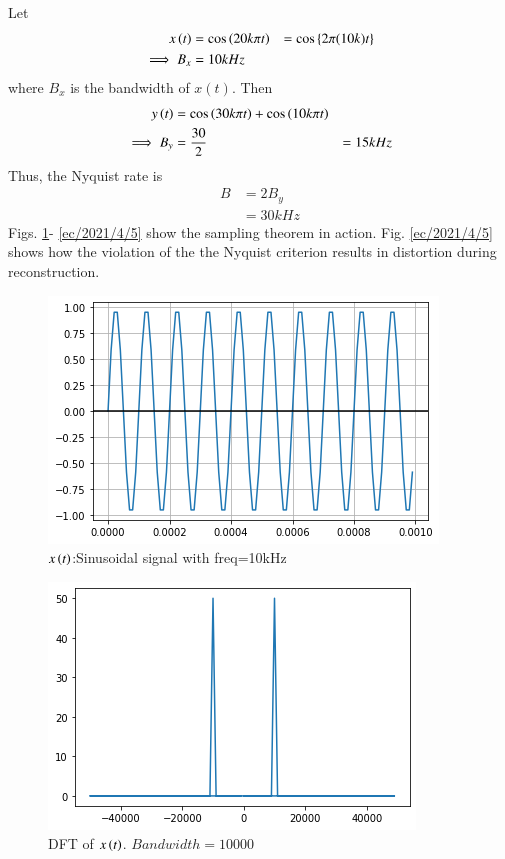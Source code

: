 Let 
\begin{align}
  x\left(t\right)&=\cos{\ensuremath{\left(20k\pi t\right)}}
  &= \cos{\ensuremath{\left\{2\pi (10k) t\right\}}}
  \\
  \implies B_x &= 10 kHz
\end{align}
where $B_x$ is the bandwidth of $x(t)$.  Then 
\begin{align}
    y\left(t\right)&= \cos{\ensuremath{\left(30k\pi t\right)}}+\cos{\ensuremath{\left(10k\pi t\right)}}\\
    \implies B_y &= \frac{30}{2} 
    &= 15 kHz
\end{align}
Thus, the Nyquist rate is 
\begin{align}
B &= 2 B_y\\
    &= 30 kHz
\end{align}
Figs.  \ref{ec/2021/4/1}- \ref{ec/2021/4/5} show the sampling theorem in action.  Fig. \ref{ec/2021/4/5} shows
how the violation of the the Nyquist criterion results in distortion during reconstruction.
%
\begin{figure}[!h]
 \centering
 \includegraphics[width=\columnwidth]{solutions/ec/2021/4/figs/x.png}
 \caption{$x\left(t\right)$:Sinusoidal signal with freq=10kHz}
 \label{ec/2021/4/1}
\end{figure}
\begin{figure}[!h]
 \centering
 \includegraphics[width=\columnwidth]{solutions/ec/2021/4/figs/xf.png}
 \caption{DFT of $x\left(t\right)$. $Bandwidth=10000$}
 \label{ec/2021/4/2}
 \end{figure}
